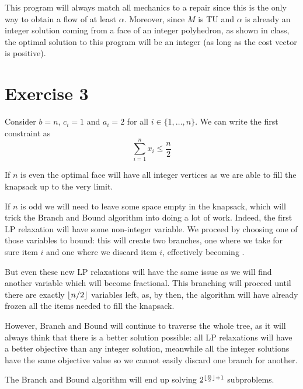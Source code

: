 \documentclass[12pt]{extarticle}
\numberwithin{equation}{section}
\begin{document}
This program will always match all mechanics to a repair since this is the only way to obtain a flow
of at least $\alpha$.
Moreover, since $M$ is TU and $\alpha$ is already an integer solution coming from a face of an
integer polyhedron, as shown in class, the optimal solution to this program will be an integer (as
long as the cost vector is positive).

\section*{Exercise 3}

Consider $b = n$, $c_i = 1$ and $a_i = 2$ for all $i \in \{ 1, \dots, n\}$.
We can write the first constraint as
\begin{equation}
	\sum_{i = 1}^n x_i \leq \frac{n}{2}
\end{equation}

If $n$ is even the optimal face will have all integer vertices as we are able to fill the knapsack
up to the very limit.

If $n$ is odd we will need to leave some space empty in the knapsack, which will trick the Branch
and Bound algorithm into doing a lot of work.
Indeed, the first LP relaxation will have some non-integer variable. We proceed by choosing one of
those variables to bound: this will create two branches, one where we take for sure item $i$ and one
where we discard item $i$, effectively becoming .

But even these new LP relaxations will have the same issue as we will find another variable which
will become fractional. This branching will proceed until there are exactly $\lfloor n/2\rfloor$ variables
left, as, by then, the algorithm will have already frozen all the items needed to fill the knapsack.

However, Branch and Bound will continue to traverse the whole tree, as it will always think that
there is a better solution possible: all LP relaxations will have a better objective than any
integer solution, meanwhile all the integer solutions have the same objective value so we cannot
easily discard one branch for another.

The Branch and Bound algorithm will end up solving $2^{\lfloor\frac{n}{2}\rfloor+1}$ subproblems.
\end{document}
